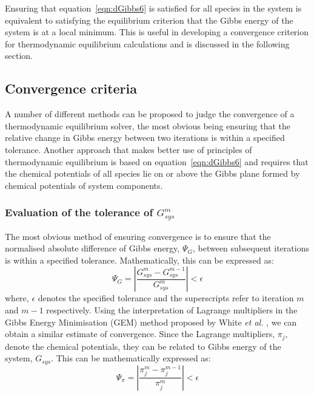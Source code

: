 		Ensuring that equation~\ref{eqn:dGibbs6} is satisfied for all species in the system is equivalent to satisfying the equilibrium criterion that the Gibbs energy of the system is at a local minimum. This is useful in developing a convergence criterion for thermodynamic equilibrium calculations and is discussed in the following section.

	\subsection{Convergence criteria}
	A number of different methods can be proposed to judge the convergence of a thermodynamic equilibrium solver, the most obvious being ensuring that the relative change in Gibbs energy between two iterations is within a specified tolerance. Another approach that makes better use of principles of thermodynamic equilibrium is based on equation~\ref{eqn:dGibbs6} and requires that the chemical potentials of all species lie on or above the Gibbs plane formed by chemical potentials of system components.
		\subsubsection{Evaluation of the tolerance of $G_{sys}^m$}
		The most obvious method of ensuring convergence is to ensure that the normalised absolute difference of Gibbs energy, $\Psi_G$, between subsequent iterations is within a specified tolerance. Mathematically, this can be expressed as:
		\begin{equation}\label{eqn:conv1}
			\Psi_G = \left \vert \frac{G_{sys}^{m} - G_{sys}^{m-1}}{G_{sys}^{m}} \right \vert < \epsilon
		\end{equation}
		where, $\epsilon$ denotes the specified tolerance and the superscripts refer to iteration $m$ and $m-1$ respectively. Using the interpretation of Lagrange multipliers in the Gibbs Energy Minimisation (GEM) method proposed by White \textit{et al.} \cite{White58a}, we can obtain a similar estimate of convergence. Since the Lagrange multipliers, $\pi_{j}$, denote the chemical potentials, they can be related to Gibbs energy of the system, $G_{sys}$. This can be mathematically expressed as:
		\begin{equation}\label{eqn:conv2}
			\Psi_{\pi} = \left \vert \frac{\pi_{j}^{m} - \pi_{j}^{m-1}}{\pi_{j}^{m}} \right \vert < \epsilon
		\end{equation}

